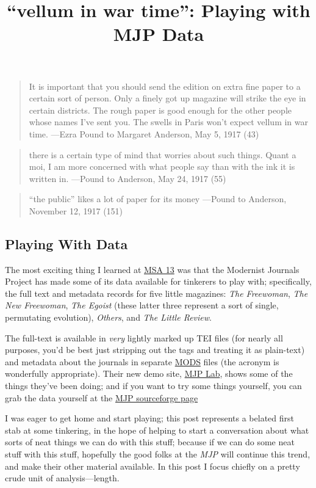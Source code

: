 \documentclass[
  12pt,
]{article}
\title{``vellum in war time'': Playing with MJP Data}
\author{}
\date{}
\begin{document}
\begin{quote}
It is important that you should send the edition on extra fine paper to
a certain sort of person. Only a finely got up magazine will strike the
eye in certain districts. The rough paper is good enough for the other
people whose names I've sent you. The swells in Paris won't expect
vellum in war time. ---Ezra Pound to Margaret Anderson, May 5, 1917 (43)
\end{quote}

\begin{quote}
there is a certain type of mind that worries about such things. Quant a
moi, I am more concerned with what people say than with the ink it is
written in. ---Pound to Anderson, May 24, 1917 (55)
\end{quote}

\begin{quote}
``the public'' likes a lot of paper for its money ---Pound to Anderson,
November 12, 1917 (151)
\end{quote}

\hypertarget{playing-with-data}{%
\subsection{Playing With Data}\label{playing-with-data}}

The most exciting thing I learned at
\href{http://msa.press.jhu.edu/conferences/msa13/index.html}{MSA 13} was
that the Modernist Journals Project has made some of its data available
for tinkerers to play with; specifically, the full text and metadata
records for five little magazines: \emph{The Freewoman}, \emph{The New
Freewoman}, \emph{The Egoist} (these latter three represent a sort of
single, permutating evolution), \emph{Others}, and \emph{The Little
Review}.

The full-text is available in \emph{very} lightly marked up TEI files
(for nearly all purposes, you'd be best just stripping out the tags and
treating it as plain-text) and metadata about the journals in separate
\href{http://www.loc.gov/standards/mods/}{MODS} files (the acronym is
wonderfully appropriate). Their new demo site,
\href{http://dev.stg.brown.edu/projects/mjplab/}{MJP Lab}, shows some of
the things they've been doing; and if you want to try some things
yourself, you can grab the data yourself at the
\href{http://sourceforge.net/p/mjplab/home/Home/}{MJP sourceforge page}

I was eager to get home and start playing; this post represents a
belated first stab at some tinkering, in the hope of helping to start a
conversation about what sorts of neat things we can do with this stuff;
because if we can do some neat stuff with this stuff, hopefully the good
folks at the \emph{MJP} will continue this trend, and make their other
material available. In this post I focus chiefly on a pretty crude unit
of analysis---length.
\end{document}
